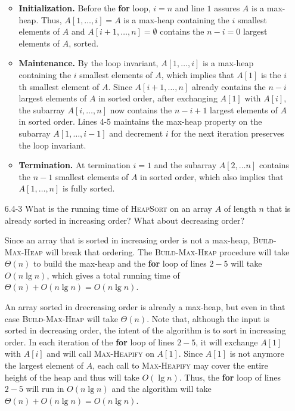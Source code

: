 \begin{enumerate}
\begin{framed}
\begin{itemize}
  \item \textbf{Initialization.} Before the \textbf{for} loop, $i = n$ and line
    $1$ assures $A$ is a max-heap. Thus, $A[1, \dots, i] = A$ is a max-heap
    containing the $i$ smallest elements of $A$ and
    $A[i + 1, \dots, n] = \emptyset$ contains the $n - i = 0$ largest elements
    of $A$, sorted.
  \item \textbf{Maintenance.} By the loop invariant, $A[1, \dots, i]$ is
    a max-heap containing the $i$ smallest elements of $A$, which implies that
    $A[1]$ is the $i$th smallest element of $A$. Since $A[i + 1, \dots, n]$
    already contains the $n - i$ largest elements of $A$ in sorted order, after
    exchanging $A[1]$ with $A[i]$, the subarray $A[i, \dots, n]$ now contains
    the $n - i + 1$ largest elements of $A$ in sorted order. Lines 4-5 maintains
    the max-heap property on the subarray $A[1, \dots, i - 1]$ and decrement $i$
    for the next iteration preserves the loop invariant.
  \item \textbf{Termination.} At termination $i = 1$ and the subarray
    $A[2, \dots n]$ contains the $n - 1$ smallest elements of $A$ in sorted
    order, which also implies that $A[1, \dots, n]$ is fully sorted.
\end{itemize}
\end{framed}

\newpage

\item[6.4-3]{What is the running time of \textsc{HeapSort} on an array $A$ of
length $n$ that is already sorted in increasing order? What about decreasing
order?}

\begin{framed}
Since an array that is sorted in increasing order is not a max-heap,
\textsc{Build-Max-Heap} will break that ordering. The \textsc{Build-Max-Heap}
procedure will take $\Theta(n)$ to build the max-heap and the \textbf{for} loop
of lines $2{-}5$ will take $O(n \lg n)$, which gives a total running time of
$\Theta(n) + O(n \lg n) = O(n \lg n)$.

An array sorted in drecreasing order is already a max-heap, but even in that
case \textsc{Build-Max-Heap} will take $\Theta(n)$. Note that, although the
input is sorted in decreasing order, the intent of the algorithm is to sort in
increasing order. In each iteration of the \textbf{for} loop of lines $2{-}5$,
it will exchange $A[1]$ with $A[i]$ and will call \textsc{Max-Heapify} on
$A[1]$. Since $A[1]$ is not anymore the largest element of $A$, each call to
\textsc{Max-Heapify} may cover the entire height of the heap and thus will take
$O(\lg n)$. Thus, the \textbf{for} loop of lines $2{-}5$ will run in
$O(n \lg n)$ and the algorithm will take $\Theta(n) + O(n \lg n) = O(n \lg n)$.
\end{framed}


\end{enumerate}
